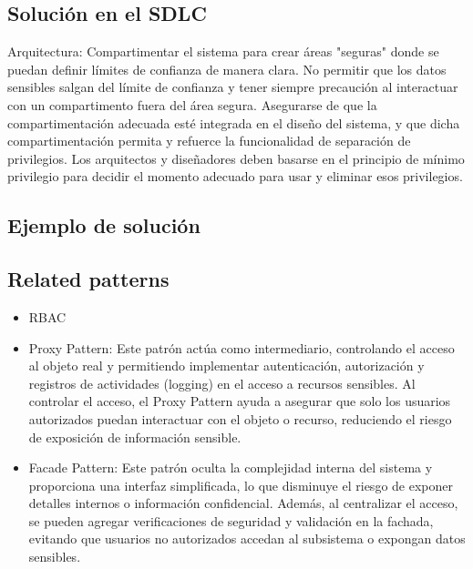 \subsection{Solución en el SDLC}
Arquitectura: Compartimentar el sistema para crear áreas "seguras" donde se puedan definir límites de confianza de manera clara. No permitir que los datos sensibles salgan del límite de confianza y tener siempre precaución al interactuar con un compartimento fuera del área segura.
Asegurarse de que la compartimentación adecuada esté integrada en el diseño del sistema, y que dicha compartimentación permita y refuerce la funcionalidad de separación de privilegios. Los arquitectos y diseñadores deben basarse en el principio de mínimo privilegio para decidir el momento adecuado para usar y eliminar esos privilegios.
\subsection{Ejemplo de solución}
\subsection{Related patterns}

\begin{itemize}
    \item RBAC
    \item Proxy Pattern: Este patrón actúa como intermediario, controlando el acceso al objeto real y permitiendo implementar autenticación, autorización y registros de actividades (logging) en el acceso a recursos sensibles. Al controlar el acceso, el Proxy Pattern ayuda a asegurar que solo los usuarios autorizados puedan interactuar con el objeto o recurso, reduciendo el riesgo de exposición de información sensible.
    \item Facade Pattern: Este patrón oculta la complejidad interna del sistema y proporciona una interfaz simplificada, lo que disminuye el riesgo de exponer detalles internos o información confidencial. Además, al centralizar el acceso, se pueden agregar verificaciones de seguridad y validación en la fachada, evitando que usuarios no autorizados accedan al subsistema o expongan datos sensibles.
\end{itemize}